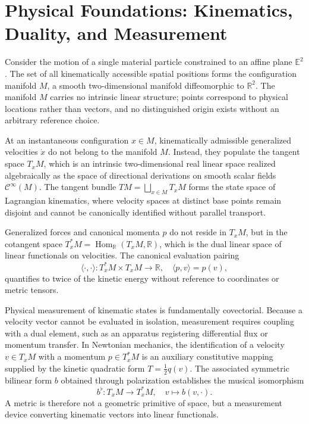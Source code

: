 \documentclass[11pt,a4paper]{article}
\begin{document}
\makeseminarheader

\section{Physical Foundations: Kinematics, Duality, and Measurement}
\label{sec:physics}

Consider the motion of a single material particle constrained to an affine
plane $\mathbb{E}^2$.
The set of all kinematically accessible spatial positions forms the
configuration manifold $M$, a smooth two-dimensional manifold diffeomorphic
to $\mathbb{R}^2$.
The manifold $M$ carries no intrinsic linear structure; points correspond to
physical locations rather than vectors, and no distinguished origin exists
without an arbitrary reference choice.

At an instantaneous configuration $x \in M$, kinematically admissible
generalized velocities $\dot{x}$ do not belong to the manifold $M$.
Instead, they populate the tangent space $T_x M$, which is an intrinsic
two-dimensional real linear space realized algebraically as the space of
directional derivations on smooth scalar fields $\mathcal{C}^\infty(M)$.
The tangent bundle $TM = \bigsqcup_{x \in M} T_x M$ forms the state space of
Lagrangian kinematics, where velocity spaces at distinct base points remain
disjoint and cannot be canonically identified without parallel transport.

Generalized forces and canonical momenta $p$ do not reside in $T_x M$, but in
the cotangent space $T_x^* M = \operatorname{Hom}_\mathbb{R}(T_x M,
\mathbb{R})$, which is the dual linear space of linear functionals on
velocities.
The canonical evaluation pairing
\begin{equation}
  \langle \cdot, \cdot \rangle : T_x^* M \times T_x M \longrightarrow
  \mathbb{R}, \quad \langle p, v \rangle = p(v),
\end{equation}
quantifies to twice of the kinetic energy without reference to
coordinates or metric tensors.

Physical measurement of kinematic states is fundamentally covectorial.
Because a velocity vector cannot be evaluated in isolation, measurement
requires coupling with a dual element, such as an apparatus registering
differential flux or momentum transfer.
In Newtonian mechanics, the identification of a velocity $v \in T_x M$ with a
momentum $p \in T_x^* M$ is an auxiliary constitutive mapping supplied by the
kinetic quadratic form $T = \frac{1}{2} q(v)$.
The associated symmetric bilinear form $b$ obtained through polarization
establishes the musical isomorphism
\begin{equation}
  b^\flat : T_x M \longrightarrow T_x^* M, \quad v \mapsto b(v, \cdot).
\end{equation}
A metric is therefore not a geometric primitive of space, but a measurement
device converting kinematic vectors into linear functionals.
\end{document}
